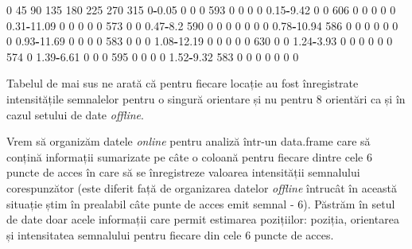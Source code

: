 \documentclass[]{article}
\newenvironment{Shaded}{\begin{snugshade}}{\end{snugshade}}
\newcommand{\DecValTok}[1]{\textcolor[rgb]{0.00,0.00,0.81}{#1}}
\newcommand{\FloatTok}[1]{\textcolor[rgb]{0.00,0.00,0.81}{#1}}
\newcommand{\OperatorTok}[1]{\textcolor[rgb]{0.81,0.36,0.00}{\textbf{#1}}}
\begin{document}
\begin{Shaded}
\begin{Highlighting}[]
               \DecValTok{0}  \DecValTok{45}  \DecValTok{90} \DecValTok{135} \DecValTok{180} \DecValTok{225} \DecValTok{270} \DecValTok{315}
  \DecValTok{0}\OperatorTok{-}\FloatTok{0.05}       \DecValTok{0}   \DecValTok{0}   \DecValTok{0} \DecValTok{593}   \DecValTok{0}   \DecValTok{0}   \DecValTok{0}   \DecValTok{0}
  \FloatTok{0.15}\OperatorTok{-}\FloatTok{9.42}    \DecValTok{0}   \DecValTok{0} \DecValTok{606}   \DecValTok{0}   \DecValTok{0}   \DecValTok{0}   \DecValTok{0}   \DecValTok{0}
  \FloatTok{0.31}\OperatorTok{-}\FloatTok{11.09}   \DecValTok{0}   \DecValTok{0}   \DecValTok{0}   \DecValTok{0}   \DecValTok{0} \DecValTok{573}   \DecValTok{0}   \DecValTok{0}
  \FloatTok{0.47}\OperatorTok{-}\FloatTok{8.2}   \DecValTok{590}   \DecValTok{0}   \DecValTok{0}   \DecValTok{0}   \DecValTok{0}   \DecValTok{0}   \DecValTok{0}   \DecValTok{0}
  \FloatTok{0.78}\OperatorTok{-}\FloatTok{10.94} \DecValTok{586}   \DecValTok{0}   \DecValTok{0}   \DecValTok{0}   \DecValTok{0}   \DecValTok{0}   \DecValTok{0}   \DecValTok{0}
  \FloatTok{0.93}\OperatorTok{-}\FloatTok{11.69}   \DecValTok{0}   \DecValTok{0}   \DecValTok{0}   \DecValTok{0} \DecValTok{583}   \DecValTok{0}   \DecValTok{0}   \DecValTok{0}
  \FloatTok{1.08}\OperatorTok{-}\FloatTok{12.19}   \DecValTok{0}   \DecValTok{0}   \DecValTok{0}   \DecValTok{0}   \DecValTok{0} \DecValTok{630}   \DecValTok{0}   \DecValTok{0}
  \FloatTok{1.24}\OperatorTok{-}\FloatTok{3.93}    \DecValTok{0}   \DecValTok{0}   \DecValTok{0}   \DecValTok{0}   \DecValTok{0}   \DecValTok{0} \DecValTok{574}   \DecValTok{0}
  \FloatTok{1.39}\OperatorTok{-}\FloatTok{6.61}    \DecValTok{0}   \DecValTok{0}   \DecValTok{0} \DecValTok{595}   \DecValTok{0}   \DecValTok{0}   \DecValTok{0}   \DecValTok{0}
  \FloatTok{1.52}\OperatorTok{-}\FloatTok{9.32}  \DecValTok{583}   \DecValTok{0}   \DecValTok{0}   \DecValTok{0}   \DecValTok{0}   \DecValTok{0}   \DecValTok{0}   \DecValTok{0}
\end{Highlighting}
\end{Shaded}

Tabelul de mai sus ne arată că pentru fiecare locație au fost
înregistrate intensitățile semnalelor pentru o singură orientare și nu
pentru 8 orientări ca și în cazul setului de date \emph{offline}.

Vrem să organizăm datele \emph{online} pentru analiză într-un data.frame
care să conțină informații sumarizate pe câte o coloană pentru fiecare
dintre cele 6 puncte de acces în care să se înregistreze valoarea
intensității semnalului corespunzător (este diferit față de organizarea
datelor \emph{offline} întrucât în această situație știm în prealabil
câte punte de acces emit semnal - 6). Păstrăm în setul de date doar
acele informații care permit estimarea pozițiilor: poziția, orientarea
și intensitatea semnalului pentru fiecare din cele 6 puncte de acces.
\end{document}
